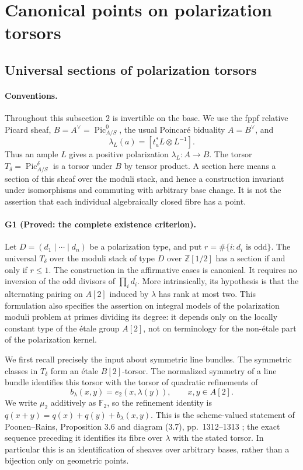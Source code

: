 \section{Canonical points on polarization torsors}
\subsection{Universal sections of polarization torsors}
\paragraph{Conventions.}
Throughout this subsection $2$ is invertible on the base.  We use the
fppf relative Picard sheaf, $B=A^\vee=\operatorname{Pic}^0_{A/S}$,
the usual Poincaré biduality $A=B^\vee$, and
\[
 \lambda_L(a)=[t_a^*L\otimes L^{-1}].
\]
Thus an ample $L$ gives a positive polarization $\lambda_L:A\to B$.
The torsor $T_\delta=\operatorname{Pic}^{\delta}_{A/S}$ is a torsor under
$B$ by tensor product.  A section here means a section of this sheaf
over the moduli stack, and hence a construction invariant under
isomorphisms and commuting with arbitrary base change.  It is not the
assertion that each individual algebraically closed fibre has a point.

\paragraph{G1 (Proved: the complete existence criterion).}
Let $D=(d_1\mid\cdots\mid d_n)$ be a polarization type, and put
$r=\#\{i: d_i\text{ is odd}\}$.  The universal $T_\delta$ over the
moduli stack of type $D$ over $\mathbb Z[1/2]$ has a section if and only
if $r\leq1$.  The construction in the affirmative cases is canonical.
It requires no inversion of the odd divisors of $\prod_i d_i$.
More intrinsically, its hypothesis is that the alternating pairing
on $A[2]$ induced by $\lambda$ has rank at most two.  This formulation
also specifies the assertion on integral models of the polarization
moduli problem at primes dividing its degree: it depends only on the
locally constant type of the étale group $A[2]$, not on terminology for
the non-étale part of the polarization kernel.

We first recall precisely the input about symmetric line bundles.
The symmetric classes in $T_\delta$ form an étale $B[2]$-torsor.  The
normalized symmetry of a line bundle identifies this torsor with the
torsor of quadratic refinements of
\[
 b_\lambda(x,y)=e_2(x,\lambda(y)),\qquad x,y\in A[2].
\]
We write $\mu_2$ additively as $\mathbb F_2$, so the refinement identity
is $q(x+y)=q(x)+q(y)+b_\lambda(x,y)$.  This is the scheme-valued
statement of Poonen--Rains, Proposition 3.6 and diagram (3.7),
pp.~1312--1313 \cite{DGJ_PoonenRains2011}; the exact sequence preceding
it identifies its fibre over $\lambda$ with the stated torsor.
In particular this is an identification of sheaves over arbitrary
bases, rather than a bijection only on geometric points.

